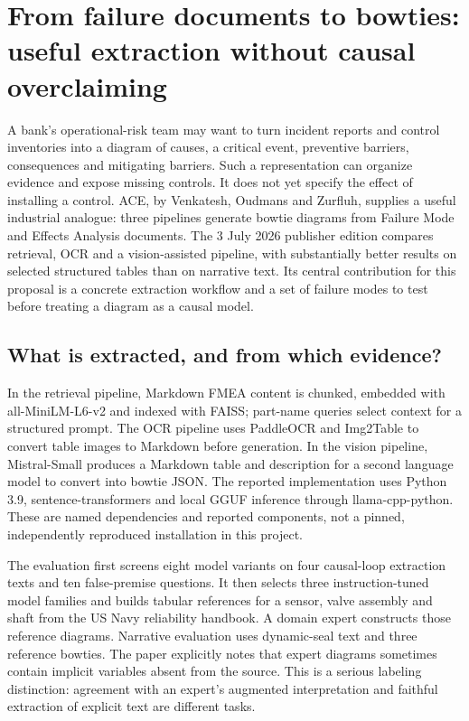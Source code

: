 \section{From failure documents to bowties: useful extraction without causal overclaiming}
\label{exec21:ace-scope}
A bank's operational-risk team may want to turn incident reports and control inventories into a diagram of causes, a critical event, preventive barriers, consequences and mitigating barriers. Such a representation can organize evidence and expose missing controls. It does not yet specify the effect of installing a control. ACE, by Venkatesh, Oudmans and Zurfluh, supplies a useful industrial analogue: three pipelines generate bowtie diagrams from Failure Mode and Effects Analysis documents. The 3 July 2026 publisher edition compares retrieval, OCR and a vision-assisted pipeline, with substantially better results on selected structured tables than on narrative text. Its central contribution for this proposal is a concrete extraction workflow and a set of failure modes to test before treating a diagram as a causal model.\citep{exec21_ace}

\subsection{What is extracted, and from which evidence?}
\label{exec21:ace-pipeline}
In the retrieval pipeline, Markdown FMEA content is chunked, embedded with all-MiniLM-L6-v2 and indexed with FAISS; part-name queries select context for a structured prompt. The OCR pipeline uses PaddleOCR and Img2Table to convert table images to Markdown before generation. In the vision pipeline, Mistral-Small produces a Markdown table and description for a second language model to convert into bowtie JSON. The reported implementation uses Python 3.9, sentence-transformers and local GGUF inference through llama-cpp-python. These are named dependencies and reported components, not a pinned, independently reproduced installation in this project.\citep{exec21_ace}

The evaluation first screens eight model variants on four causal-loop extraction texts and ten false-premise questions. It then selects three instruction-tuned model families and builds tabular references for a sensor, valve assembly and shaft from the US Navy reliability handbook. A domain expert constructs those reference diagrams. Narrative evaluation uses dynamic-seal text and three reference bowties. The paper explicitly notes that expert diagrams sometimes contain implicit variables absent from the source. This is a serious labeling distinction: agreement with an expert's augmented interpretation and faithful extraction of explicit text are different tasks.\citep{exec21_ace}

